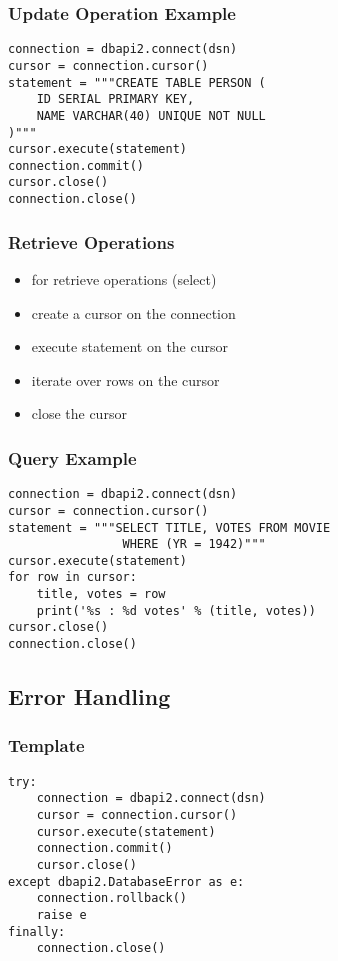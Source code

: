 \documentclass[dvipsnames]{beamer}
\theoremstyle{plain}
\begin{document}
\begin{frame}[fragile]
  \frametitle{Update Operation Example}

  \begin{lstlisting}
connection = dbapi2.connect(dsn)
cursor = connection.cursor()
statement = """CREATE TABLE PERSON (
    ID SERIAL PRIMARY KEY,
    NAME VARCHAR(40) UNIQUE NOT NULL
)"""
cursor.execute(statement)
connection.commit()
cursor.close()
connection.close()
  \end{lstlisting}
\end{frame}

\begin{frame}
  \frametitle{Retrieve Operations}

  \begin{itemize}
    \item for retrieve operations (select)

    \bigskip
    \item create a cursor on the connection
    \item execute statement on the cursor
    \item iterate over rows on the cursor
    \item close the cursor
  \end{itemize}
\end{frame}

\begin{frame}[fragile]
  \frametitle{Query Example}

  \begin{lstlisting}
connection = dbapi2.connect(dsn)
cursor = connection.cursor()
statement = """SELECT TITLE, VOTES FROM MOVIE
                WHERE (YR = 1942)"""
cursor.execute(statement)
for row in cursor:
    title, votes = row
    print('%s : %d votes' % (title, votes))
cursor.close()
connection.close()
  \end{lstlisting}
\end{frame}

\subsection{Error Handling}

\begin{frame}[fragile]
  \frametitle{Template}

  \begin{lstlisting}
try:
    connection = dbapi2.connect(dsn)
    cursor = connection.cursor()
    cursor.execute(statement)
    connection.commit()
    cursor.close()
except dbapi2.DatabaseError as e:
    connection.rollback()
    raise e
finally:
    connection.close()
  \end{lstlisting}
\end{frame}
\end{document}

